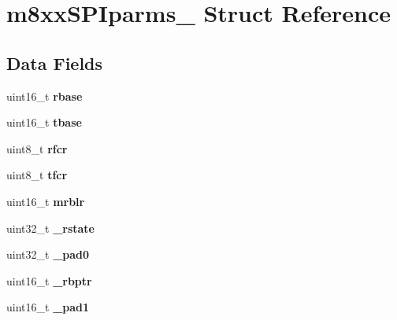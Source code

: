 \hypertarget{structm8xxSPIparms__}{}\section{m8xx\+S\+P\+Iparms\+\_\+ Struct Reference}
\label{structm8xxSPIparms__}
\subsection*{Data Fields}
\begin{DoxyCompactItemize}
\item 
\mbox{\label{structm8xxSPIparms___af2d706630cc0a50986b9c62910a82697}} 
uint16\+\_\+t {\bfseries rbase}
\item 
\mbox{\label{structm8xxSPIparms___ab1da3424189fde0c0542d1d33f75440d}} 
uint16\+\_\+t {\bfseries tbase}
\item 
\mbox{\label{structm8xxSPIparms___a9524d8d1da3f7a69e2779a4adc57816b}} 
uint8\+\_\+t {\bfseries rfcr}
\item 
\mbox{\label{structm8xxSPIparms___a742e1fc2c95ee3894b3effdc896018d9}} 
uint8\+\_\+t {\bfseries tfcr}
\item 
\mbox{\label{structm8xxSPIparms___acd08370f3c961ce4f703c170e4079ab9}} 
uint16\+\_\+t {\bfseries mrblr}
\item 
\mbox{\label{structm8xxSPIparms___a5087babf7742f42e37d2ef645799120f}} 
uint32\+\_\+t {\bfseries \+\_\+rstate}
\item 
\mbox{\label{structm8xxSPIparms___ae9647869cc1a2a081251b13030a75c24}} 
uint32\+\_\+t {\bfseries \+\_\+pad0}
\item 
\mbox{\label{structm8xxSPIparms___acbce816afbe6fa8be30e943a911f8995}} 
uint16\+\_\+t {\bfseries \+\_\+rbptr}
\item 
\mbox{\label{structm8xxSPIparms___aa69562843e321c8427afb9e8d97448f3}} 
uint16\+\_\+t {\bfseries \+\_\+pad1}
\item 
\mbox{\label{structm8xxSPIparms___a9642ae5aa03464fa97e334ab459cac61}} 

\end{DoxyCompactItemize}
